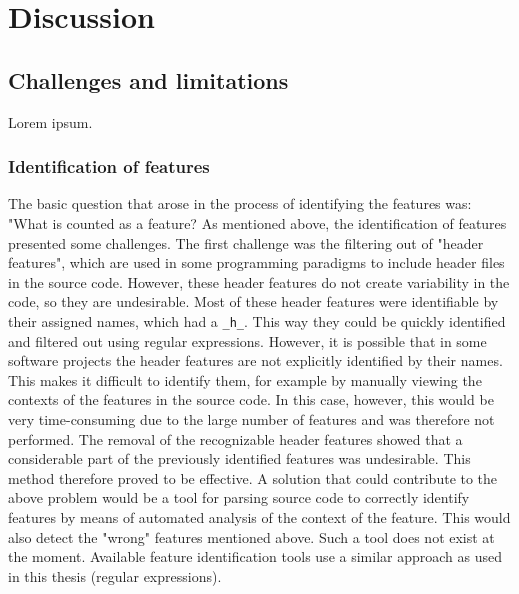 
\section{Discussion}

\subsection{Challenges and limitations}
Lorem ipsum.

\subsubsection*{Identification of features}
The basic question that arose in the process of identifying the features was: "What is counted as a feature? As mentioned above, the identification of features presented some challenges. The first challenge was the filtering out of "header features", which are used in some programming paradigms to include header files in the source code. However, these header features do not create variability in the code, so they are undesirable. Most of these header features were identifiable by their assigned names, which had a \texttt{\_h\_}. This way they could be quickly identified and filtered out using regular expressions. However, it is possible that in some software projects the header features are not explicitly identified by their names. This makes it difficult to identify them, for example by manually viewing the contexts of the features in the source code. In this case, however, this would be very time-consuming due to the large number of features and was therefore not performed. The removal of the recognizable header features showed that a considerable part of the previously identified features was undesirable. This method therefore proved to be effective. A solution that could contribute to the above problem would be a tool for parsing source code to correctly identify features by means of automated analysis of the context of the feature. This would also detect the "wrong" features mentioned above. Such a tool does not exist at the moment. Available feature identification tools use a similar approach as used in this thesis (regular expressions).

